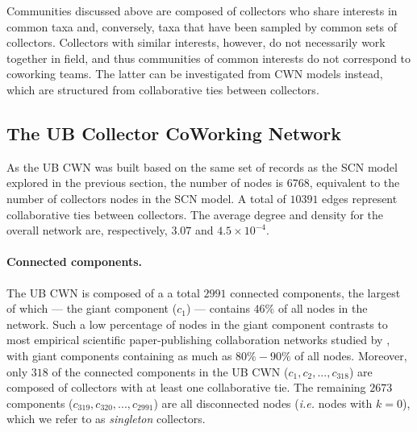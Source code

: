 

Communities discussed above are composed of collectors who share interests in common taxa and, conversely, taxa that have been sampled by common sets of collectors.
Collectors with similar interests, however, do not necessarily work together in field, and thus communities of common interests do not correspond to coworking teams.
The latter can be investigated from CWN models instead, which are structured from collaborative ties between collectors.




\subsection{The UB Collector CoWorking Network} \label{section:ub_cwn}

As the UB CWN was built based on the same set of records as the SCN model explored in the previous section, the number of nodes is $6768$, equivalent to the number of collectors nodes in the SCN model.
A total of $10391$ edges represent collaborative ties between collectors.
The average degree and density for the overall network are, respectively, $3.07$ and $4.5 \times 10^{-4}$.

\paragraph{Connected components.}
The UB CWN is composed of a a total $2991$ connected components, the largest of which --- the giant component ($c_1$) ---  contains $46\%$ of all nodes in the network.
Such a low percentage of nodes in the giant component contrasts to most empirical scientific paper-publishing collaboration networks studied by , with giant components containing as much as $80\% - 90\%$ of all nodes.
Moreover, only $318$ of the connected components in the UB CWN ($c_1, c_2, ..., c_{318}$) are composed of collectors with at least one collaborative tie.
The remaining $2673$ components ($c_{319}, c_{320}, ..., c_{2991}$) are all disconnected nodes (\textit{i.e.} nodes with $k=0$), which we refer to as \textit{singleton} collectors.

